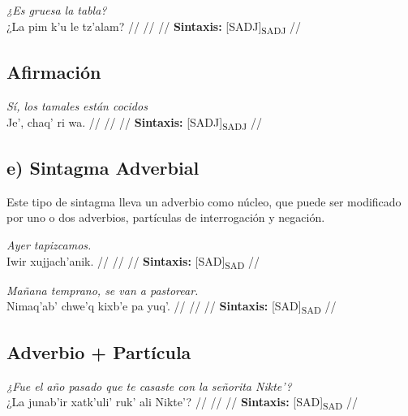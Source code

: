 \documentclass{article}%
\begin{document}
%
\par\medskip%
\ex
\textit{¿Es gruesa la tabla?} \\
\begingl
\gla ¿La pim k’u le tz'alam? //
\glb  //
\glc  //
\glft \textbf{Sintaxis:} [SADJ]\textsubscript{SADJ} //
\endgl
\xe
%
\medskip%
\subsection{Afirmación}%
\label{subsec:Afirmacin}%

%
\par\medskip%
\ex
\textit{Sí, los tamales están cocidos} \\
\begingl
\gla Je', chaq' ri wa. //
\glb  //
\glc  //
\glft \textbf{Sintaxis:} [SADJ]\textsubscript{SADJ} //
\endgl
\xe
%
\medskip%
\subsection{e) Sintagma Adverbial}%
\label{subsec:e)SintagmaAdverbial}%

%
Este tipo de sintagma lleva un adverbio como núcleo, que puede ser modificado por uno %
o dos adverbios, partículas de interrogación y negación. %
\par\medskip%
\ex
\textit{Ayer tapizcamos.} \\
\begingl
\gla Iwir xujjach'anik. //
\glb  //
\glc  //
\glft \textbf{Sintaxis:} [SAD]\textsubscript{SAD} //
\endgl
\xe
%
\medskip%
\par\medskip%
\ex
\textit{Mañana temprano, se van a pastorear.} \\
\begingl
\gla Nimaq'ab' chwe'q kixb'e pa yuq'. //
\glb  //
\glc  //
\glft \textbf{Sintaxis:} [SAD]\textsubscript{SAD} //
\endgl
\xe
%
\medskip%
\subsection{Adverbio + Partícula}%
\label{subsec:Adverbio+Partcula}%

%
\par\medskip%
\ex
\textit{¿Fue el año pasado que te casaste con la señorita Nikte'?} \\
\begingl
\gla ¿La junab'ir xatk'uli' ruk' ali Nikte'? //
\glb  //
\glc  //
\glft \textbf{Sintaxis:} [SAD]\textsubscript{SAD} //
\endgl
\xe
%

%
\end{document}
